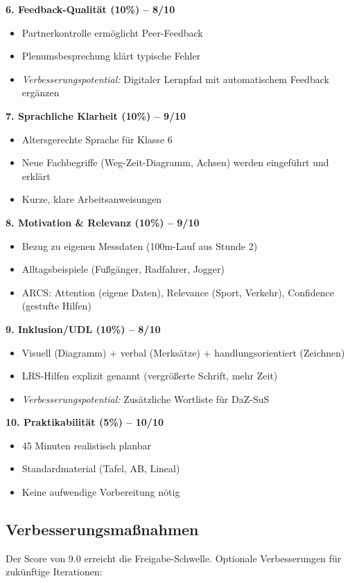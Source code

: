 \documentclass[11pt,a4paper]{article}
\begin{document}
\textbf{6. Feedback-Qualität (10\%) -- 8/10}
\begin{itemize}
    \item Partnerkontrolle ermöglicht Peer-Feedback
    \item Plenumsbesprechung klärt typische Fehler
    \item \textit{Verbesserungspotential:} Digitaler Lernpfad mit automatischem Feedback ergänzen
\end{itemize}

\textbf{7. Sprachliche Klarheit (10\%) -- 9/10}
\begin{itemize}
    \item Altersgerechte Sprache für Klasse 6
    \item Neue Fachbegriffe (Weg-Zeit-Diagramm, Achsen) werden eingeführt und erklärt
    \item Kurze, klare Arbeitsanweisungen
\end{itemize}

\textbf{8. Motivation \& Relevanz (10\%) -- 9/10}
\begin{itemize}
    \item Bezug zu eigenen Messdaten (100m-Lauf aus Stunde 2)
    \item Alltagsbeispiele (Fußgänger, Radfahrer, Jogger)
    \item ARCS: Attention (eigene Daten), Relevance (Sport, Verkehr), Confidence (gestufte Hilfen)
\end{itemize}

\textbf{9. Inklusion/UDL (10\%) -- 8/10}
\begin{itemize}
    \item Visuell (Diagramm) + verbal (Merksätze) + handlungsorientiert (Zeichnen)
    \item LRS-Hilfen explizit genannt (vergrößerte Schrift, mehr Zeit)
    \item \textit{Verbesserungspotential:} Zusätzliche Wortliste für DaZ-SuS
\end{itemize}

\textbf{10. Praktikabilität (5\%) -- 10/10}
\begin{itemize}
    \item 45 Minuten realistisch planbar
    \item Standardmaterial (Tafel, AB, Lineal)
    \item Keine aufwendige Vorbereitung nötig
\end{itemize}

\subsection{Verbesserungsmaßnahmen}
Der Score von 9.0 erreicht die Freigabe-Schwelle. Optionale Verbesserungen für zukünftige Iterationen:
\end{document}
